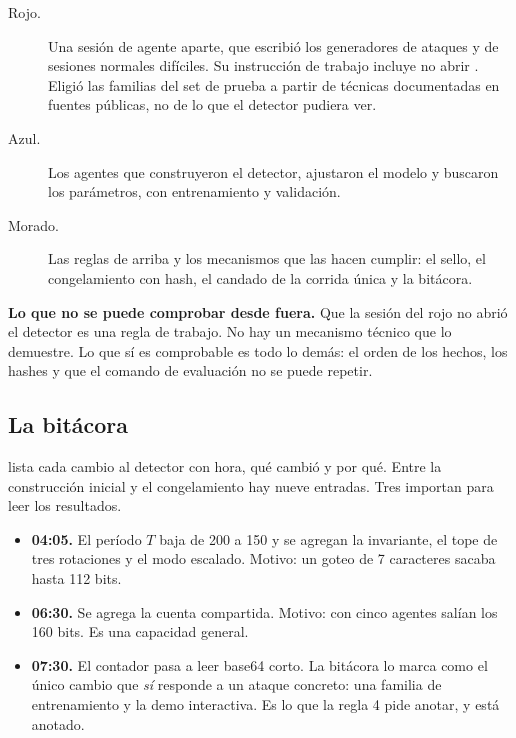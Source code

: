 \begin{description}
  \item[Rojo.] Una sesión de agente aparte, que escribió los generadores de ataques y de sesiones
    normales difíciles. Su instrucción de trabajo incluye no abrir . Eligió las familias
    del set de prueba a partir de técnicas documentadas en fuentes públicas, no de lo que el detector
    pudiera ver.
  \item[Azul.] Los agentes que construyeron el detector, ajustaron el modelo y buscaron los
    parámetros, con entrenamiento y validación.
  \item[Morado.] Las reglas de arriba y los mecanismos que las hacen cumplir: el sello, el
    congelamiento con hash, el candado de la corrida única y la bitácora.
\end{description}

\begin{limite}
\textbf{Lo que no se puede comprobar desde fuera.} Que la sesión del rojo no abrió el detector es una
regla de trabajo. No hay un mecanismo técnico que lo demuestre. Lo que sí es comprobable es todo lo
demás: el orden de los hechos, los hashes y que el comando de evaluación no se puede repetir.
\end{limite}

\subsection{La bitácora}

 lista cada cambio al detector con hora, qué cambió y por qué. Entre la
construcción inicial y el congelamiento hay nueve entradas. Tres importan para leer los resultados.

\begin{itemize}
  \item \textbf{04:05.} El período $T$ baja de 200 a 150 y se agregan la invariante, el tope de tres
    rotaciones y el modo escalado. Motivo: un goteo de 7 caracteres sacaba hasta 112 bits.
  \item \textbf{06:30.} Se agrega la cuenta compartida. Motivo: con cinco agentes salían los 160 bits.
    Es una capacidad general.
  \item \textbf{07:30.} El contador pasa a leer base64 corto. La bitácora lo marca como el único cambio
    que \emph{sí} responde a un ataque concreto: una familia de entrenamiento y la demo interactiva.
    Es lo que la regla 4 pide anotar, y está anotado.
\end{itemize}

